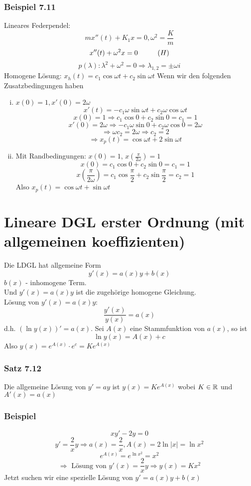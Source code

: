 \subsubsection*{Beispiel 7.11}
Lineares Federpendel:
\[mx''(t)+K_1x=0, \omega^2=\frac{K}{m}\]
\[x''(t)+\omega^2x=0\hspace{10mm}(H)\]
\[p(\lambda):\lambda^2+\omega^2=0\Rightarrow\lambda_{1,2}=\pm\omega i\]
Homogene Lösung: $x_h(t)=c_1\cos\omega t+c_2\sin\omega t$
Wenn wir den folgenden Zusatzbedingungen haben
\begin{enumerate}[(i)]
\item $x(0)=1, x'(0)=2\omega$
\[x'(t)=-c_1\omega\sin\omega t+c_2\omega\cos\omega t\]
\[x(0)=1\Rightarrow c_1\cos 0+c_2\sin 0=c_1=1\]
\[x'(0)=2\omega\Rightarrow-c_1\omega\sin 0+c_2\omega\cos 0=2\omega\]
\[\Rightarrow \omega c_2=2\omega\Rightarrow c_2=2\]
\[\Rightarrow x_p(t)=\cos\omega t+2\sin\omega t\]
\item Mit Randbedingungen: $x(0)=1$, $x\left(\frac{\pi}{2\omega}\right)=1$
\[x(0)=c_1\cos 0+c_2\sin 0=c_1=1\]
\[x\left(\frac{\pi}{2\omega}\right)=c_1\cos\frac{\pi}{2}+c_2\sin\frac{\pi}{2}=c_2=1\]
Also $x_p(t)=\cos\omega t+\sin\omega t$
\end{enumerate}

\section{Lineare DGL erster Ordnung (mit allgemeinen koeffizienten)}
Die LDGL hat allgemeine Form \[y'(x)=a(x)y+b(x)\] $b(x)$ - inhomogene Term.\\

\noindent Und $y'(x)=a(x)y$ ist die zugehörige homogene Gleichung. \\

\noindent Lösung von $y'(x)=a(x)y$: \[\frac{y'(x)}{y(x)}=a(x)\]
d.h. $\left( \ln y(x)\right)'=a(x)$. Sei $A(x)$ eine Stammfunktion von $a(x)$, so ist \[\ln y(x)=A(x)+c\] Also $y(x)=e^{A(x)}\cdot e^c=Ke^{A(x)}$
\subsubsection*{Satz 7.12} 
Die allgemeine Lösung von $y'=ay$ ist $y(x)=Ke^{A(x)}$ wobei $K\in\mathbb{R}$ und $A'(x)=a(x)$
\subsubsection*{Beispiel}
\[xy'-2y=0\]
\[y'=\frac{2}{x}y\Rightarrow a(x)=\frac{2}{x}, A(x)=2\ln\left|x\right|=\ln x^2\]
\[e^{A(x)}=e^{\ln x^2}=x^2\]
\[\Rightarrow\text{ Lösung von }y'(x)=\frac{2}{x}y \Rightarrow y(x)=Kx^2\]
Jetzt suchen wir eine spezielle Lösung von $y'=a(x)y+b(x)$ 
